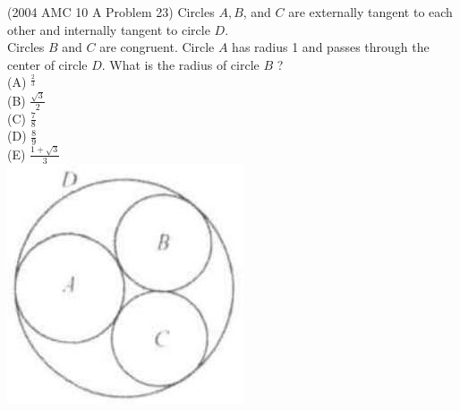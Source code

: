 \documentclass{article}
\begin{document}
(2004 AMC 10 A Problem 23) Circles \(A, B\), and \(C\) are externally tangent to each other and internally tangent to circle \(D\).\\
Circles \(B\) and \(C\) are congruent. Circle \(A\) has radius 1 and passes through the center of circle \(D\). What is the radius of circle \(B\) ?\\
(A) \({ }^{\frac{2}{3}}\)\\
(B) \(\frac{\sqrt{3}}{2}\)\\
(C) \(\frac{7}{8}\)\\
(D) \(\frac{8}{9}\)\\
(E) \(\frac{1+\sqrt{3}}{3}\)\\
\centering
\includegraphics[width=\textwidth]{images/180.jpg}
\end{document}
